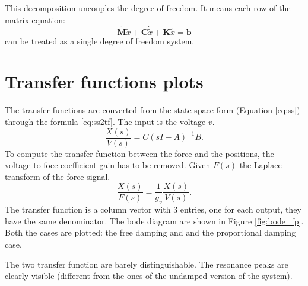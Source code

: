 \documentclass[twosided,a4paper]{article}           %
\begin{document}
This decomposition uncouples the degree of freedom. It means each row of the matrix equation:
\begin{equation}
\bm{\tilde{M}} \ddot{\tilde{x}} + \bm{\tilde{C}} \dot{\tilde{x}} + \bm{\tilde{K}} \tilde{x} = \bm b
\label{eq:eqm:modal}
\end{equation}
can be treated as a single degree of freedom system.

\section{Transfer functions plots}
The transfer functions are converted from the state space form (Equation \eqref{eq:ss}) through the formula \eqref{eq:ss2tf}. The input is the voltage $v$.
\begin{equation}
\label{eq:ss2tf}
	\dfrac{X(s)}{V(s)} = C(sI-A)^{-1}B.
\end{equation}
To compute the transfer function between the force and the positions, the voltage-to-foce coefficient gain has to be removed. Given $F(s)$ the Laplace transform of the force signal.
\begin{equation}
	\dfrac{X(s)}{F(s)} = \dfrac{1}{g_v}\dfrac{X(s)}{V(s)}.
\end{equation}
The transfer function is a column vector with 3 entries, one for each output, they have the same denominator. The bode diagram are shown in Figure \ref{fig:bode_fp}. Both the cases are plotted: the free damping and and the proportional damping case. \\
\par \noindent
The two transfer function are barely distinguishable. The resonance peaks are clearly visible (different from the ones of the undamped version of the system).
\end{document}
